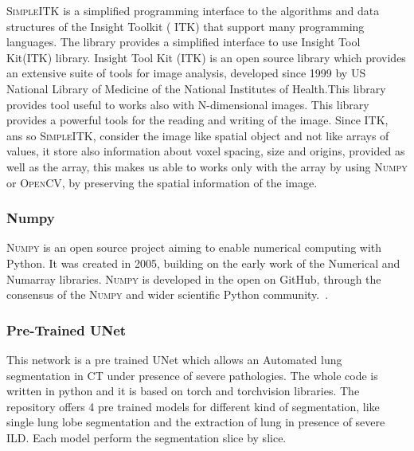 \documentclass{standalone}
\begin{document}
	\textsc{SimpleITK} is a simplified programming interface to the algorithms and data structures of the Insight Toolkit ( \textsc{ITK}) that support many programming languages. The library provides a simplified interface to use Insight Tool Kit(ITK) library. 
	Insight Tool Kit (ITK) is an open source library which provides an extensive suite of tools for image analysis, developed since 1999 by US National Library of Medicine of the National Institutes of Health.This library provides tool useful to works also with N-dimensional images. 
	This library provides a powerful tools for the reading and writing of the image. Since \textsc{ITK}, ans so \textsc{SimpleITK},  consider the image like spatial object and not like arrays of values, it store also information about voxel spacing, size and origins, provided as well as the array, this makes us able to works only with the array by using \textsc{Numpy} or \textsc{OpenCV}, by preserving the spatial information of the image.
	
	\subsubsection*{Numpy}
	
	\textsc{Numpy} is an open source project aiming to enable numerical computing with Python. It was created in 2005, building on the early work of the Numerical and Numarray libraries.	\textsc{Numpy} is developed in the open on GitHub, through the consensus of the \textsc{Numpy} and wider scientific Python community.~\cite{Numpy}. 

	\subsubsection*{Pre-Trained UNet} 
	
	This network is a pre trained UNet which allows an Automated lung segmentation in CT under presence of severe pathologies. The whole code is written in python and it is based on torch and torchvision libraries. The repository offers 4 pre trained models for different kind of segmentation, like single lung lobe segmentation and the extraction of lung in presence of severe ILD. Each model perform the segmentation slice by slice. 
	
\end{document}
